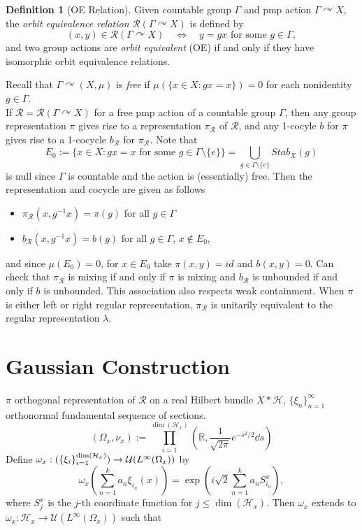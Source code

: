 \documentclass[12pt,letterpaper]{article}
\newcommand{\lr}[1]{\left(#1\right)}
\newcommand{\R}{\mathbb{R}\xspace}
\renewcommand{\H}{\mathcal{H}}
\let\Span\relax
\DeclareMathOperator{\Span}{Span}
\newcommand{\acts}{\curvearrowright}
\theoremstyle{definition}
\newtheorem{definition}{Definition}[]
\theoremstyle{plain}
\theoremstyle{remark}
\begin{document}
\begin{definition}[OE Relation]
    Given countable group $ \Gamma $ and pmp action $ \Gamma\acts X $, the \textit{orbit equivalence relation} $\mathcal{R}(\Gamma\acts X)$ is defined by
    \[
        (x,y)\in \mathcal{R}(\Gamma\acts X)\quad\iff\quad y = gx \text{ for some } g\in \Gamma,
    \]
    and two group actions are \textit{orbit equivalent} (OE) if and only if they have isomorphic orbit equivalence relations.
    

\end{definition}

Recall that $ \Gamma\acts(X,\mu) $ is \textit{free} if $ \mu(\{x\in X: gx = x\}) = 0 $ for each nonidentity $ g\in \Gamma $.\\

If $ \mathcal{R} = \mathcal{R}(\Gamma\acts X) $ for a free pmp action of a countable group $ \Gamma $, then any group representation $ \pi $ gives rise to a representation $ \pi_{\mathcal{R}} $ of $ \mathcal{R} $, and any 1-cocyle $ b $ for $ \pi $ gives rise to a 1-cocycle $ b_{\mathcal{R}} $ for $ \pi_{\mathcal{R}} $. Note that
\[
    E_{0} := \{x\in X: gx = x \text{ for some } g\in \Gamma\setminus\{e\}\} = \bigcup_{g\in \Gamma\setminus\{e\}}Stab_{X}(g)
\]
is null since $ \Gamma $ is countable and the action is (essentially) free. Then the representation and cocycle are given as follows

\begin{itemize}
    \item $ \pi_{\mathcal{R}}(x,g^{-1}x) = \pi(g) $ for all $ g\in \Gamma $
    \item $ b_{\mathcal{R}}(x,g^{-1}x) = b(g) $ for all $ g\in \Gamma $, $ x\not\in E_{0} $,
\end{itemize}
and since $ \mu(E_{0}) = 0 $, for $ x\in E_{0} $ take $ \pi(x,y) = id $ and $ b(x,y) = 0 $. Can check that $ \pi_{\mathcal{R}} $ is mixing if and only if $ \pi $ is mixing and $ b_{\mathcal{R}} $ is unbounded if and only if $ b $ is unbounded. This association also respects weak containment. When $ \pi $ is either left or right regular representation, $ \pi_{\mathcal{R}} $ is unitarily equivalent to the regular representation $ \lambda $.

\section{Gaussian Construction}

$ \pi $ orthogonal representation of $ \mathcal{R} $ on a real Hilbert bundle $ X\ast\H $, $ \{\xi_{n}\}_{n=1}^{\infty} $ orthonormal fundamental sequence of sections.
\[
    (\Omega_{x},\nu_{x}) := \prod_{i=1}^{\dim(\H_{x})} \lr{\R, \frac{1}{\sqrt{2\pi}}e^{-s^{2}/2}\dd{s}}
\]
Define $ \omega_{x}:\Span(\{\xi_{i}\}_{i=1}^{\dim(\H_{x})})\to \mathcal{U}(L^{\infty}(\Omega_{x})) $ by 
\[
    \omega_{x}\lr{\sum_{n=1}^{k}a_{n} \xi_{i_{n}}(x)} = \exp\lr{i \sqrt{2}\sum_{n=1}^{k}a_{n}S_{i_{n}}^{x}},
\]
where $ S^{x}_{j} $ is the $ j $-th coordinate function for $ j\leq \dim(\H_{x}) $. Then $ \omega_{x} $ extends to $ \omega_{x}:\H_{x}\to \mathcal{U}(L^{\infty}(\Omega_{x})) $ such that 
\end{document}
